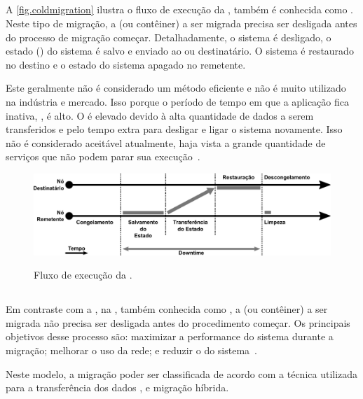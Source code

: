\subsection{\Coldmigration}\label{sec.coldmigration}
A \autoref{fig.coldmigration} ilustra o fluxo de execução da \coldmigration, também é conhecida como \nonlivemigration. Neste tipo de migração, a \vm (ou contêiner) a ser migrada precisa ser desligada antes do processo de migração começar. Detalhadamente, o sistema é desligado, o estado (\checkpoint) do sistema é salvo e enviado ao \so ou \vm destinatário. O sistema é restaurado no destino e o estado do sistema apagado no remetente.

Este geralmente não é considerado um método eficiente e não é muito utilizado na indústria e mercado. Isso porque o período de tempo em que a aplicação fica inativa, \aka \downtime, é alto. O \downtime é elevado devido à alta quantidade de dados a serem transferidos e pelo tempo extra para desligar e ligar o sistema novamente. Isso não é considerado aceitável atualmente, haja vista a grande quantidade de serviços que não podem parar sua execução~\cite{singh2022predictive, imran2022live}.

\begin{figure}[bt]
    \centering
    \caption{Fluxo de execução da \coldmigration.}
    \includegraphics[width=0.8\linewidth]{content/images/cold-migration-flow.pdf}
    \label{fig.coldmigration}
\end{figure}

\subsection{\Hotmigration}\label{sec.hotmigration}
Em contraste com a \coldmigration, na \hotmigration, também conhecida como \livemigration, a \vm (ou contêiner) a ser migrada não precisa ser desligada antes do procedimento começar. Os principais objetivos desse processo são: maximizar a performance do sistema durante a migração; melhorar o uso da rede; e reduzir o \downtime do sistema~\cite{imran2022live}.

Neste modelo, a migração poder ser classificada de acordo com a técnica utilizada para a transferência dos dados \ie \precopymigration, \postcopymigration e migração híbrida.

